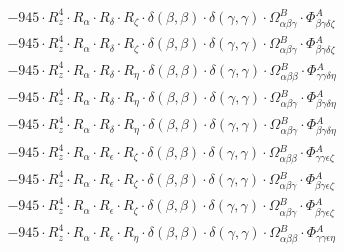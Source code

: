 \documentclass{article}
\begin{document}
\begin{subequations}
\begin{gather}
\begin{array}{c}
 \\[0.2em] 		 - 945 \cdot R_{z}^{4} \cdot R_{\alpha{}} \cdot R_{\delta{}} \cdot R_{\zeta{}} \cdot \delta{}\left(\beta{}, \beta{}\right) \cdot \delta{}\left(\gamma{}, \gamma{}\right) \cdot \Omega{}^{B}_{\alpha{}\beta{}\gamma{}} \cdot \Phi{}^{A}_{\beta{}\gamma{}\delta{}\zeta{}} 
 \\[0.2em] 		 - 945 \cdot R_{z}^{4} \cdot R_{\alpha{}} \cdot R_{\delta{}} \cdot R_{\zeta{}} \cdot \delta{}\left(\beta{}, \beta{}\right) \cdot \delta{}\left(\gamma{}, \gamma{}\right) \cdot \Omega{}^{B}_{\alpha{}\beta{}\gamma{}} \cdot \Phi{}^{A}_{\beta{}\gamma{}\delta{}\zeta{}} 
 \\[0.2em] 		 - 945 \cdot R_{z}^{4} \cdot R_{\alpha{}} \cdot R_{\delta{}} \cdot R_{\eta{}} \cdot \delta{}\left(\beta{}, \beta{}\right) \cdot \delta{}\left(\gamma{}, \gamma{}\right) \cdot \Omega{}^{B}_{\alpha{}\beta{}\beta{}} \cdot \Phi{}^{A}_{\gamma{}\gamma{}\delta{}\eta{}} 
 \\[0.2em] 		 - 945 \cdot R_{z}^{4} \cdot R_{\alpha{}} \cdot R_{\delta{}} \cdot R_{\eta{}} \cdot \delta{}\left(\beta{}, \beta{}\right) \cdot \delta{}\left(\gamma{}, \gamma{}\right) \cdot \Omega{}^{B}_{\alpha{}\beta{}\gamma{}} \cdot \Phi{}^{A}_{\beta{}\gamma{}\delta{}\eta{}} 
 \\[0.2em] 		 - 945 \cdot R_{z}^{4} \cdot R_{\alpha{}} \cdot R_{\delta{}} \cdot R_{\eta{}} \cdot \delta{}\left(\beta{}, \beta{}\right) \cdot \delta{}\left(\gamma{}, \gamma{}\right) \cdot \Omega{}^{B}_{\alpha{}\beta{}\gamma{}} \cdot \Phi{}^{A}_{\beta{}\gamma{}\delta{}\eta{}} 
 \\[0.2em] 		 - 945 \cdot R_{z}^{4} \cdot R_{\alpha{}} \cdot R_{\epsilon{}} \cdot R_{\zeta{}} \cdot \delta{}\left(\beta{}, \beta{}\right) \cdot \delta{}\left(\gamma{}, \gamma{}\right) \cdot \Omega{}^{B}_{\alpha{}\beta{}\beta{}} \cdot \Phi{}^{A}_{\gamma{}\gamma{}\epsilon{}\zeta{}} 
 \\[0.2em] 		 - 945 \cdot R_{z}^{4} \cdot R_{\alpha{}} \cdot R_{\epsilon{}} \cdot R_{\zeta{}} \cdot \delta{}\left(\beta{}, \beta{}\right) \cdot \delta{}\left(\gamma{}, \gamma{}\right) \cdot \Omega{}^{B}_{\alpha{}\beta{}\gamma{}} \cdot \Phi{}^{A}_{\beta{}\gamma{}\epsilon{}\zeta{}} 
 \\[0.2em] 		 - 945 \cdot R_{z}^{4} \cdot R_{\alpha{}} \cdot R_{\epsilon{}} \cdot R_{\zeta{}} \cdot \delta{}\left(\beta{}, \beta{}\right) \cdot \delta{}\left(\gamma{}, \gamma{}\right) \cdot \Omega{}^{B}_{\alpha{}\beta{}\gamma{}} \cdot \Phi{}^{A}_{\beta{}\gamma{}\epsilon{}\zeta{}} 
 \\[0.2em] 		 - 945 \cdot R_{z}^{4} \cdot R_{\alpha{}} \cdot R_{\epsilon{}} \cdot R_{\eta{}} \cdot \delta{}\left(\beta{}, \beta{}\right) \cdot \delta{}\left(\gamma{}, \gamma{}\right) \cdot \Omega{}^{B}_{\alpha{}\beta{}\beta{}} \cdot \Phi{}^{A}_{\gamma{}\gamma{}\epsilon{}\eta{}} 

\end{array}
\end{gather}
\end{subequations}
\end{document}
